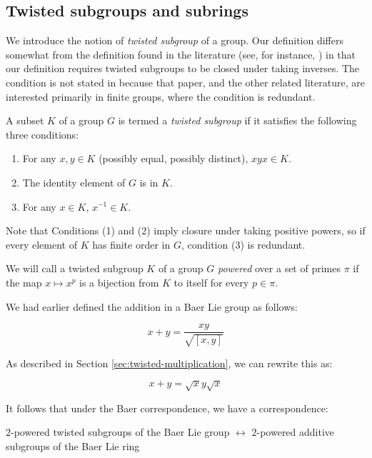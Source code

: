 \subsection{Twisted subgroups and subrings}

We introduce the notion of {\em twisted subgroup} of a group. Our
definition differs somewhat from the definition found in the
literature (see, for instance, \cite{Foguelinv}) in that our
definition requires twisted subgroups to be closed under taking
inverses. The condition is not stated in \cite{Foguelinv} because that
paper, and the other related literature, are interested primarily in
finite groups, where the condition is redundant.

\begin{definer}
  A subset $K$ of a group $G$ is termed a {\em twisted subgroup} if it
  satisfies the following three conditions:

  \begin{enumerate}
  \item For any $x,y \in K$ (possibly equal, possibly distinct), $xyx
    \in K$.
  \item The identity element of $G$ is in $K$.
  \item For any $x \in K$, $x^{-1} \in K$.
  \end{enumerate}

  Note that Conditions (1) and (2) imply closure under taking positive
  powers, so if every element of $K$ has finite order in $G$,
  condition (3) is redundant.
\end{definer}

We will call a twisted subgroup $K$ of a group $G$ {\em powered} over
a set of primes $\pi$ if the map $x \mapsto x^p$ is a bijection from
$K$ to itself for every $p \in \pi$.

We had earlier defined the addition in a Baer Lie group as follows:

$$x + y = \frac{xy}{\sqrt{[x,y]}}$$

As described in Section \ref{sec:twisted-multiplication}, we can
rewrite this as:

$$x + y = \sqrt{x} y \sqrt{x}$$

It follows that under the Baer correspondence, we have a correspondence:

\begin{center}
  $2$-powered twisted subgroups of the Baer Lie group $\leftrightarrow$ $2$-powered additive subgroups of the Baer Lie ring
\end{center}

